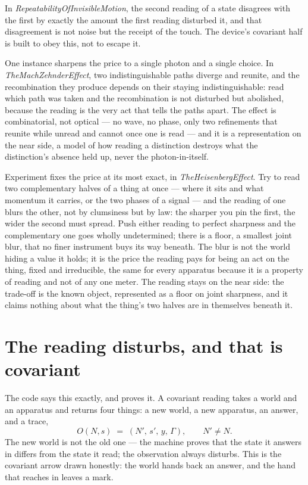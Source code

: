 In \emph{RepeatabilityOfInvisibleMotion}, the second reading of a state disagrees with the first by exactly the amount the
first reading disturbed it, and that disagreement is not noise but the receipt of the touch.
The device's covariant half is built to obey this, not to escape it.

One instance sharpens the price to a single photon and a single choice.
In \emph{TheMachZehnderEffect}, two indistinguishable paths diverge and reunite, and the recombination they produce
depends on their staying indistinguishable: read which path was taken and the recombination is not disturbed but
abolished, because the reading is the very act that tells the paths apart.
The effect is combinatorial, not optical --- no wave, no phase, only two refinements that reunite while unread and cannot
once one is read --- and it is a representation on the near side, a model of how reading a distinction destroys what the
distinction's absence held up, never the photon-in-itself.

Experiment fixes the price at its most exact, in \emph{TheHeisenbergEffect}.
Try to read two complementary halves of a thing at once --- where it sits and what momentum it carries, or the two phases
of a signal --- and the reading of one blurs the other, not by clumsiness but by law: the sharper you pin the first, the
wider the second must spread.
Push either reading to perfect sharpness and the complementary one goes wholly undetermined; there is a floor, a smallest
joint blur, that no finer instrument buys its way beneath.
The blur is not the world hiding a value it holds; it is the price the reading pays for being an act on the thing, fixed
and irreducible, the same for every apparatus because it is a property of reading and not of any one meter.
The reading stays on the near side: the trade-off is the known object, represented as a floor on joint sharpness, and it
claims nothing about what the thing's two halves are in themselves beneath it.

\section{The reading disturbs, and that is covariant}

The code says this exactly, and proves it.
A covariant reading takes a world and an apparatus and returns four things: a new world, a new apparatus, an answer,
and a trace,
\[
  O(N,s) \;=\; (N',\, s',\, y,\, \Gamma), \qquad N' \neq N .
\]
The new world is not the old one --- the machine proves that the state it answers in differs from the state it read;
the observation always disturbs.
This is the covariant arrow drawn honestly: the world hands back an answer, and the hand that reaches in leaves a mark.

